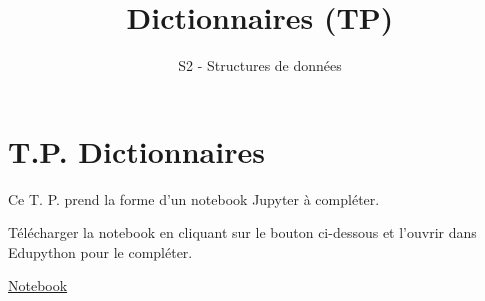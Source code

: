 \documentclass[
  a4paper,
  DIV=11,
  numbers=noendperiod]{scrartcl}
\title{Dictionnaires (TP)}
\subtitle{S2 - Structures de données}
\author{}
\date{}
\begin{document}
\maketitle
{}  \chead{} \cfoot{}   \renewcommand{\headrulewidth}{0pt} \renewcommand{\footrulewidth}{0pt} \thispagestyle{fancy} \vspace{-3cm}

\ifdefined\Shaded\renewenvironment{Shaded}{\begin{tcolorbox}[breakable, borderline west={3pt}{0pt}{shadecolor}, interior hidden, sharp corners, enhanced, frame hidden, boxrule=0pt]}{\end{tcolorbox}}\fi

\hypertarget{t.p.-dictionnaires}{%
\section{T.P. Dictionnaires}\label{t.p.-dictionnaires}}

Ce T. P. prend la forme d'un notebook Jupyter à compléter.

Télécharger la notebook en cliquant sur le bouton ci-dessous et l'ouvrir
dans Edupython pour le compléter.

\href{TPDictionnaires.ipynb}{Notebook}
\end{document}
